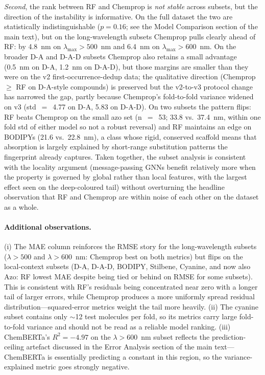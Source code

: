 \documentclass[journal=jcisd8,manuscript=suppinfo]{achemso}
\begin{document}
\textit{Second}, the rank between RF and Chemprop is \emph{not stable} across subsets, but the direction of the instability is informative. On the full dataset the two are statistically indistinguishable ($p = 0.16$; see the Model Comparison section of the main text), but on the long-wavelength subsets Chemprop pulls clearly ahead of RF: by 4.8~nm on $\lambda_{\max} > 500$~nm and 6.4~nm on $\lambda_{\max} > 600$~nm. On the broader D-A and D-A-D subsets Chemprop also retains a small advantage (0.5~nm on D-A, 1.2~nm on D-A-D), but those margins are smaller than they were on the v2 first-occurrence-dedup data; the qualitative direction (Chemprop $\geq$ RF on D-A-style compounds) is preserved but the v2-to-v3 protocol change has narrowed the gap, partly because Chemprop's fold-to-fold variance widened on v3 (std~$=$~4.77 on D-A, 5.83 on D-A-D). On two subsets the pattern flips: RF beats Chemprop on the small azo set (n~$=$~53; 33.8 vs.\ 37.4~nm, within one fold std of either model so not a robust reversal) and RF maintains an edge on BODIPYs (21.6 vs.\ 22.8~nm), a class whose rigid, conserved scaffold means that absorption is largely explained by short-range substitution patterns the fingerprint already captures. Taken together, the subset analysis is consistent with the locality argument (message-passing GNNs benefit relatively more when the property is governed by global rather than local features, with the largest effect seen on the deep-coloured tail) without overturning the headline observation that RF and Chemprop are within noise of each other on the dataset as a whole.

\paragraph{Additional observations.}
(i) The MAE column reinforces the RMSE story for the long-wavelength subsets ($\lambda > 500$ and $\lambda > 600$~nm: Chemprop best on both metrics) but flips on the local-context subsets (D-A, D-A-D, BODIPY, Stilbene, Cyanine, and now also Azo: RF lowest MAE despite being tied or behind on RMSE for some subsets). This is consistent with RF's residuals being concentrated near zero with a longer tail of larger errors, while Chemprop produces a more uniformly spread residual distribution---squared-error metrics weight the tail more heavily.
(ii) The cyanine subset contains only $\sim$12 test molecules per fold, so its metrics carry large fold-to-fold variance and should not be read as a reliable model ranking.
(iii) ChemBERTa's $R^2 = -4.97$ on the $\lambda > 600$~nm subset reflects the prediction-ceiling artefact discussed in the Error Analysis section of the main text---ChemBERTa is essentially predicting a constant in this region, so the variance-explained metric goes strongly negative.
\end{document}
